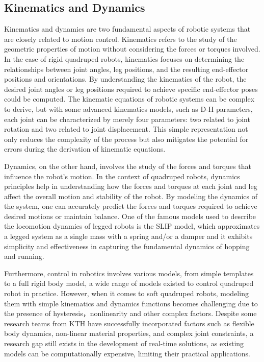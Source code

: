 \subsection{Kinematics and Dynamics}
Kinematics and dynamics are two fundamental aspects of robotic systems that are closely related to motion control. Kinematics refers to the study of the geometric properties of motion without considering the forces or torques involved. In the case of rigid quadruped robots, kinematics focuses on determining the relationships between joint angles, leg positions, and the resulting end-effector positions and orientations. By understanding the kinematics of the robot, the desired joint angles or leg positions required to achieve specific end-effector poses could be computed. The kinematic equations of robotic systems can be complex to derive, but with some advanced kinematics models, such as \ac{D-H} parameters\cite{denavitKinematicNotationLowerPair1955}, each joint can be characterized by merely four parameters: two related to joint rotation and two related to joint displacement. This simple representation not only reduces the complexity of the process but also mitigates the potential for errors during the derivation of kinematic equations.

Dynamics, on the other hand, involves the study of the forces and torques that influence the robot's motion. In the context of quadruped robots, dynamics principles help in understanding how the forces and torques at each joint and leg affect the overall motion and stability of the robot. By modeling the dynamics of the system, one can accurately predict the forces and torques required to achieve desired motions or maintain balance. One of the famous models used to describe the locomotion dynamics of legged robots is the \ac{SLIP} model\cite{poulakakisSpringLoadedInverted2009}, which approximates a legged system as a single mass with a spring and/or a damper and it exhibits simplicity and effectiveness in capturing the fundamental dynamics of hopping and running.

Furthermore, control in robotics involves various models, from simple templates to a full rigid body model, a wide range of models existed to control quadruped robot in practice\cite{hwangboSimulationRealWorld2018}. However, when it comes to soft quadruped robots, modeling them with simple kinematics and dynamics functions becomes challenging due to the presence of hysteresis，nonlinearity and other complex factors. Despite some research teams from KTH\cite{daneliaStructureGaitOptimizationof2021, lagreliusComparingFourModelling2022} have successfully incorporated factors such as flexible body dynamics, non-linear material properties, and complex joint constraints, a research gap still exists in the development of real-time solutions, as existing models can be computationally expensive, limiting their practical applications.

